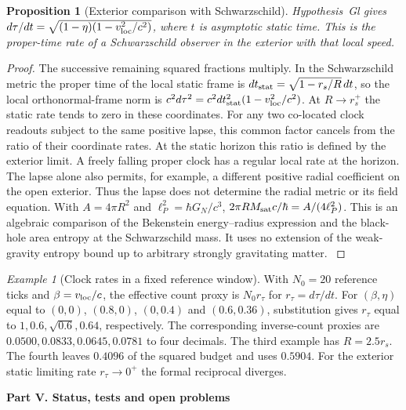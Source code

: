 \documentclass[aps,pra,onecolumn,superscriptaddress,nofootinbib,10pt]{revtex4-2}
\newtheorem{proposition}[theorem]{Proposition}
\theoremstyle{definition}
\theoremstyle{remark}
\newtheorem{example}[theorem]{Example}
\newcommand{\paperpart}[1]{\par\bigskip\begin{center}\large\bfseries #1\end{center}\par\medskip}
\begin{document}
\begin{proposition}[Exterior comparison with Schwarzschild]\label{ub:lapse}
Hypothesis~Gl gives
$d\tau/dt=\sqrt{(1-\eta)(1-v_{\rm loc}^2/c^2)}$, where $t$
is asymptotic static time. This is the proper-time rate of a
Schwarzschild observer in the exterior with that local speed.
\end{proposition}
\begin{proof}
The successive remaining squared fractions multiply.
In the Schwarzschild metric the proper time of the local static
frame is $dt_{\rm stat}=\sqrt{1-r_s/R}\,dt$, so the local
orthonormal-frame norm is
$c^2d\tau^2=c^2dt_{\rm stat}^2(1-v_{\rm loc}^2/c^2)$.
At $R\longrightarrow r_s^+$ the static rate tends to zero in
these coordinates. For any two co-located clock readouts subject to
the same positive lapse, this common factor cancels from the ratio
of their coordinate rates. At the static horizon this ratio is defined
by the exterior limit. A freely falling proper clock has a regular
local rate at the horizon. The lapse alone also permits, for example,
a different positive radial coefficient on the open exterior.
Thus the lapse does not determine the radial metric or its field equation.
With $A=4\pi R^2$ and $\ell_P^2=\hbar G_N/c^3$,
$2\pi R M_{\rm sat}c/\hbar=A/(4\ell_P^2)$. This is an algebraic
comparison of the Bekenstein energy--radius expression and the
black-hole area entropy at the Schwarzschild mass. It uses no extension
of the weak-gravity entropy bound up to arbitrary strongly gravitating
matter. \cite{ub:schwarz,ub:bek,n1-hawking}
\end{proof}

\begin{example}[Clock rates in a fixed reference window]\label{ub:clocknumbers}
With $N_0=20$ reference ticks and $\beta=v_{\rm loc}/c$, the effective
count proxy is $N_0 r_\tau$ for $r_\tau=d\tau/dt$. For $(\beta,\eta)$ equal
to $(0,0)$, $(0.8,0)$, $(0,0.4)$ and $(0.6,0.36)$, substitution gives
$r_\tau$ equal to $1,0.6,\sqrt{0.6},0.64$, respectively. The corresponding
inverse-count proxies are $0.0500,0.0833,0.0645,0.0781$ to four
decimals. The third example has $R=2.5r_s$. The fourth leaves
$0.4096$ of the squared budget and uses $0.5904$. For the exterior
static limiting rate $r_\tau\to0^+$ the formal reciprocal diverges.
\end{example}

\paperpart{Part V.  Status, tests and open problems}
\end{document}
